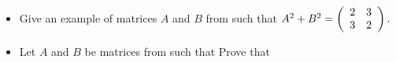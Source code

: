 
\begin{itemize}
	\item Give an example of matrices $A$ and $B$ from  such that
$
A^{2}+B^{2}=\left(
\begin{array}
[c]{cc}
2 & 3\\
3 & 2
\end{array}
\right)  .
$
	\item Let $A$ and $B$ be matrices from  such that
 Prove that 
\end{itemize}
